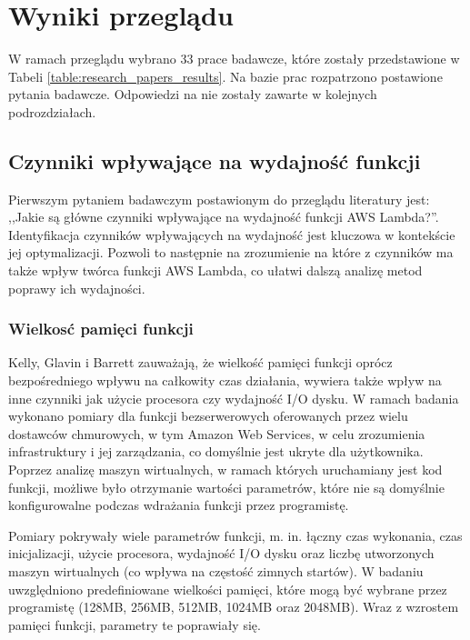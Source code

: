 \section{Wyniki przeglądu}\label{chapter:przeglad_literatury_wyniki}

W ramach przeglądu wybrano 33 prace badawcze, które zostały przedstawione w Tabeli \ref{table:research_papers_results}. 
Na bazie prac rozpatrzono postawione pytania badawcze. 
Odpowiedzi na nie zostały zawarte w kolejnych podrozdziałach.



\subsection{Czynniki wpływające na wydajność funkcji}\label{chapter:przeglad_literatury_wyniki_czynniki}

Pierwszym pytaniem badawczym postawionym do przeglądu literatury jest: ,,Jakie są główne czynniki wpływające na wydajność funkcji AWS Lambda?''.
Identyfikacja czynników wpływających na wydajność jest kluczowa w kontekście jej optymalizacji.
Pozwoli to następnie na zrozumienie na które z czynników ma także wpływ twórca funkcji AWS Lambda, co ułatwi dalszą analizę metod poprawy ich wydajności.

\subsubsection*{Wielkosć pamięci funkcji}

Kelly, Glavin i Barrett \cite{9284261} zauważają, że wielkość pamięci funkcji oprócz bezpośredniego wpływu na całkowity czas działania, wywiera także wpływ na inne czynniki jak użycie procesora czy wydajność I/O dysku. 
W ramach badania wykonano pomiary dla funkcji bezserwerowych oferowanych przez wielu dostawców chmurowych, w tym Amazon Web Services, w celu zrozumienia infrastruktury i jej zarządzania, co domyślnie jest ukryte dla użytkownika.   
Poprzez analizę maszyn wirtualnych, w ramach których uruchamiany jest kod funkcji, możliwe było otrzymanie wartości parametrów, które nie są domyślnie konfigurowalne podczas wdrażania funkcji przez programistę.

Pomiary pokrywały wiele parametrów funkcji, m. in. łączny czas wykonania, czas inicjalizacji, użycie procesora, wydajność I/O dysku oraz liczbę utworzonych maszyn wirtualnych (co wpływa na częstość zimnych startów). 
W badaniu uwzględniono predefiniowane wielkości pamięci, które mogą być wybrane przez programistę (128MB, 256MB, 512MB, 1024MB oraz 2048MB).
Wraz z wzrostem pamięci funkcji, parametry te poprawiały się.

